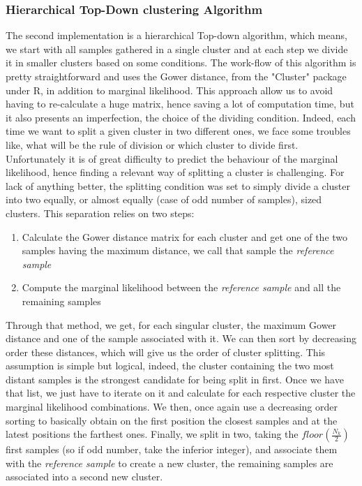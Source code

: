 \documentclass[twocolumn]{article}
\begin{document}
\subsubsection{Hierarchical Top-Down clustering Algorithm}

The second implementation is a hierarchical Top-down algorithm, which means, we start with all samples gathered in a single cluster and at each step we divide it in smaller clusters based on some conditions.
The work-flow of this algorithm is pretty straightforward and uses the Gower distance, from the "Cluster" package under R, in addition to marginal likelihood.
This approach allow us to avoid having to re-calculate a huge matrix, hence saving a lot of computation time, but it also presents an imperfection, the choice of the dividing condition.
Indeed, each time we want to split a given cluster in two different ones, we face some troubles like, what will be the rule of division or which cluster to divide first.
Unfortunately it is of great difficulty to predict the behaviour of the marginal likelihood, hence finding a relevant way of splitting a cluster is challenging.
For lack of anything better, the splitting condition was set to simply divide a cluster into two equally, or almost equally (case of odd number of samples), sized clusters. 
This separation relies on two steps:
\begin{enumerate}
    \item Calculate the Gower distance matrix for each cluster and get one of the two samples having the maximum distance, we call that sample the \emph{reference sample}
    \item Compute the marginal likelihood between the \emph{reference sample} and all the remaining samples
\end{enumerate}
Through that method, we get, for each singular cluster, the maximum Gower distance and one of the sample associated with it.
We can then sort by decreasing order these distances, which will give us the order of cluster splitting.
This assumption is simple but logical, indeed, the cluster containing the two most distant samples is the strongest candidate for being split in first.
Once we have that list, we just have to iterate on it and calculate for each respective cluster the marginal likelihood combinations.
We then, once again use a decreasing order sorting to basically obtain on the first position the closest samples and at the latest positions the farthest ones.
Finally, we split in two, taking the $floor(\frac{N_k}{2})$ first samples (so if odd number, take the inferior integer), and associate them with the \emph{reference sample} to create a new cluster, the remaining samples are associated into a second new cluster.
\end{document}
